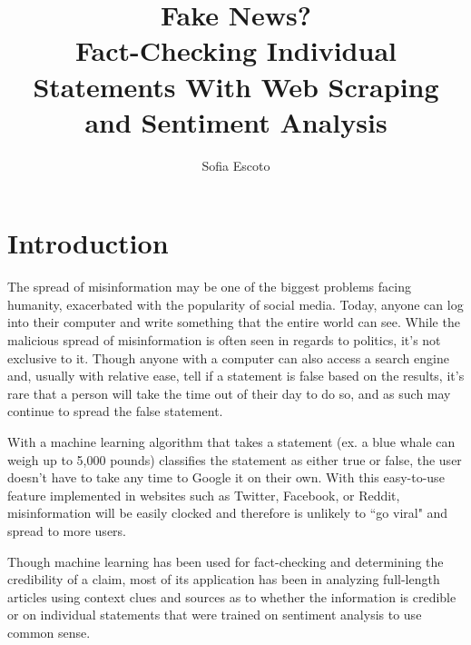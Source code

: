 \documentclass[]{article}
\title{Fake News? 
	\\\smaller[2]{}Fact-Checking Individual Statements With Web Scraping and Sentiment Analysis}
\author{Sofia Escoto}
\begin{document}
	\maketitle
	
	\section{Introduction}
		
		
		The spread of misinformation may be one of the biggest problems facing humanity, exacerbated with the popularity of social media. Today, anyone can log into their computer and write something that the entire world can see. While the malicious spread of misinformation is  often seen in regards to politics, it's not exclusive to it. Though anyone with a computer can also access a search engine and, usually with relative ease, tell if a statement is false based on the results, it's rare that a person will take the time out of their day to do so, and as such may continue to spread the false statement.
		
		With a machine learning algorithm that takes a statement (ex. a blue whale can weigh up to 5,000 pounds) classifies the statement as either true or false, the user doesn't have to take any time to Google it on their own. With this easy-to-use feature implemented in websites such as Twitter, Facebook, or Reddit, misinformation will be easily clocked and therefore is unlikely to ``go viral" and spread to more users.
		
		Though machine learning has been used for fact-checking and determining the credibility of a claim, most of its application has been in analyzing full-length articles using context clues and sources as to whether the information is credible or on individual statements that were trained on sentiment analysis to use common sense.
		
\end{document}
